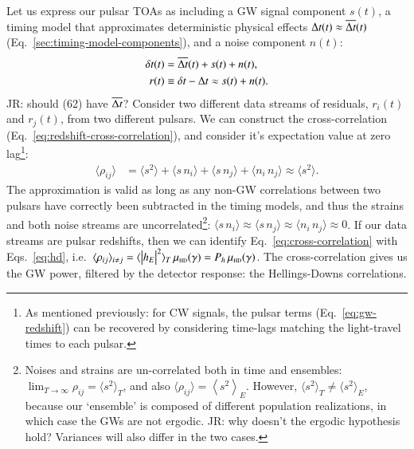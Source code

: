 \documentclass[onecolumn,authoryear]{els-mrw}
\begin{document}
Let us express our pulsar TOAs as including a GW signal component $s(t)$, a timing model that approximates deterministic physical effects ${\Delta{}t}(t) \approx \overline{{\Delta{}t}}(t)$ (Eq.~\ref{sec:timing-model-components}), and a noise component $n(t)$:
\begin{align}\label{eq:toa-components-gw}
    {\delta{}t}(t) & = \overline{{\Delta{}t}}(t) + s(t) + n(t), \\
    r(t) & \equiv {\delta{}t} - {\Delta{}t} \approx s(t) + n(t).
\end{align}
{\color{red}JR: should (62) have $\overline{{\Delta{}t}}$?}
Consider two different data streams of residuals, $r_i(t)$ and $r_j(t)$, from two different pulsars.  We can construct the cross-correlation (Eq.~\ref{eq:redshift-cross-correlation}), and consider it's expectation value at zero lag\footnote{As mentioned previously: for CW signals, the pulsar terms (Eq.~\ref{eq:gw-redshift}) can be recovered by considering time-lags matching the light-travel times to each pulsar.}:
\begin{align}\label{eq:cross-correlation}
    \langle \rho_{ij} \rangle & = \langle s^2 \rangle + \langle s \, n_i \rangle + \langle s \, n_j \rangle + \langle n_i \, n_j \rangle \approx \langle s^2 \rangle.
\end{align}
The approximation is valid as long as any non-GW correlations between two pulsars have correctly been subtracted in the timing models, and thus the strains and both noise streams are uncorrelated\footnote{Noises and strains are un-correlated both in time and ensembles: $\lim_{T \rightarrow \infty} \rho_{ij} = \langle s^2 \rangle_T$, and also \mbox{$\langle \rho_{ij} \rangle = \left< s^2 \right>_E$}.  However, $\langle s^2 \rangle_T \neq \langle s^2 \rangle_E$, because our `ensemble' is composed of different population realizations, in which case the GWs are not ergodic. {\color{red}JR: why doesn't the ergodic hypothesis hold?} Variances will also differ in the two cases.}: \mbox{$\langle s \, n_i \rangle \approx \langle s \, n_j \rangle \approx \langle n_i \, n_j \rangle \approx 0$}.  If our data streams are pulsar redshifts, then we can identify Eq.~\ref{eq:cross-correlation} with Eqs.~\ref{eq:hd}, i.e.~\mbox{$\langle \rho_{ij} \rangle_{i \neq j} = \langle \big| h_E \big|^2 \rangle_T \, \hdfunc(\gamma) = P_h \, \hdfunc(\gamma)$}.  The cross-correlation gives us the GW power, filtered by the detector response: the Hellings-Downs correlations.
\end{document}
